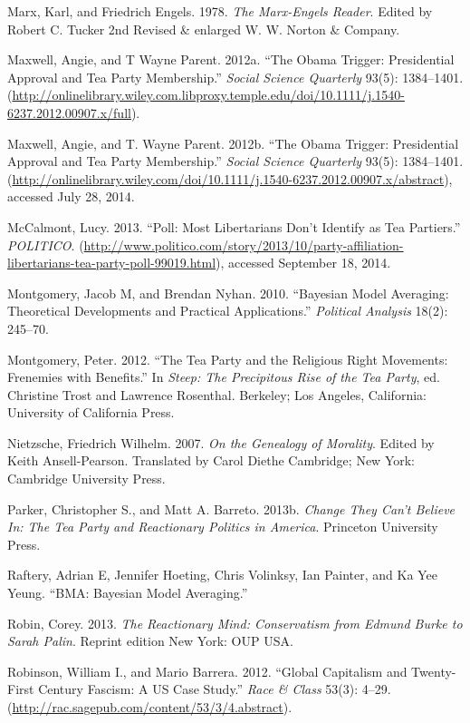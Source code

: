 \documentclass[12pt,]{article}
\begin{document}
Marx, Karl, and Friedrich Engels. 1978. \emph{The Marx-Engels Reader}.
Edited by Robert C. Tucker 2nd Revised \& enlarged W. W. Norton \&
Company.

Maxwell, Angie, and T Wayne Parent. 2012a. ``The Obama Trigger:
Presidential Approval and Tea Party Membership.'' \emph{Social Science
Quarterly} 93(5): 1384--1401.
(\url{http://onlinelibrary.wiley.com.libproxy.temple.edu/doi/10.1111/j.1540-6237.2012.00907.x/full}).

Maxwell, Angie, and T. Wayne Parent. 2012b. ``The Obama Trigger:
Presidential Approval and Tea Party Membership.'' \emph{Social Science
Quarterly} 93(5): 1384--1401.
(\url{http://onlinelibrary.wiley.com/doi/10.1111/j.1540-6237.2012.00907.x/abstract}),
accessed July 28, 2014.

McCalmont, Lucy. 2013. ``Poll: Most Libertarians Don't Identify as Tea
Partiers.'' \emph{POLITICO}.
(\url{http://www.politico.com/story/2013/10/party-affiliation-libertarians-tea-party-poll-99019.html}),
accessed September 18, 2014.

Montgomery, Jacob M, and Brendan Nyhan. 2010. ``Bayesian Model
Averaging: Theoretical Developments and Practical Applications.''
\emph{Political Analysis} 18(2): 245--70.

Montgomery, Peter. 2012. ``The Tea Party and the Religious Right
Movements: Frenemies with Benefits.'' In \emph{Steep: The Precipitous
Rise of the Tea Party}, ed. Christine Trost and Lawrence Rosenthal.
Berkeley; Los Angeles, California: University of California Press.

Nietzsche, Friedrich Wilhelm. 2007. \emph{On the Genealogy of Morality}.
Edited by Keith Ansell-Pearson. Translated by Carol Diethe Cambridge;
New York: Cambridge University Press.

Parker, Christopher S., and Matt A. Barreto. 2013b. \emph{Change They
Can't Believe In: The Tea Party and Reactionary Politics in America}.
Princeton University Press.

Raftery, Adrian E, Jennifer Hoeting, Chris Volinksy, Ian Painter, and Ka
Yee Yeung. ``BMA: Bayesian Model Averaging.''

Robin, Corey. 2013. \emph{The Reactionary Mind: Conservatism from Edmund
Burke to Sarah Palin}. Reprint edition New York: OUP USA.

Robinson, William I., and Mario Barrera. 2012. ``Global Capitalism and
Twenty-First Century Fascism: A US Case Study.'' \emph{Race \& Class}
53(3): 4--29. (\url{http://rac.sagepub.com/content/53/3/4.abstract}).
\end{document}
